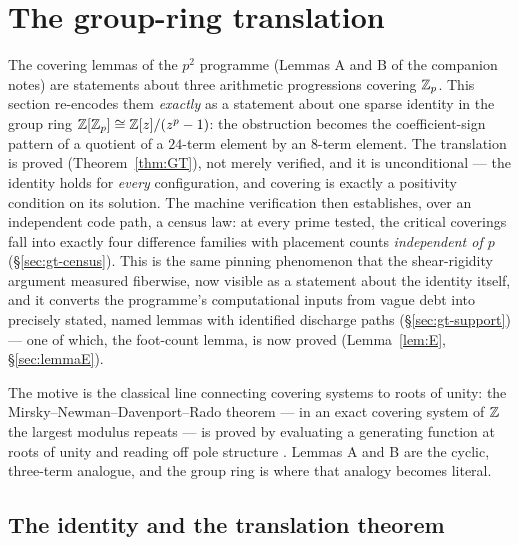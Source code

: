 
\section{The group-ring translation}\label{sec:groupring}

The covering lemmas of the $p^2$ programme (Lemmas A and B of the companion
notes) are statements about three arithmetic progressions covering $\mathbb{Z}_p$.
This section re-encodes them \emph{exactly} as a statement about one sparse
identity in the group ring $\mathbb{Z}[\mathbb{Z}_p]\cong\mathbb{Z}[z]/(z^p-1)$: the obstruction
becomes the coefficient-sign pattern of a quotient of a $24$-term element by
an $8$-term element. The translation is proved (Theorem~\ref{thm:GT}), not
merely verified, and it is unconditional --- the identity holds for
\emph{every} configuration, and covering is exactly a positivity condition on
its solution. The machine verification then establishes, over an independent
code path, a census law: at every prime tested, the critical coverings fall
into exactly four difference families with placement counts \emph{independent
of $p$} (\S\ref{sec:gt-census}). This is the same pinning phenomenon that the
shear-rigidity argument measured fiberwise, now visible as a statement about
the identity itself, and it converts the programme's computational inputs
from vague debt into precisely stated, named lemmas with identified
discharge paths (\S\ref{sec:gt-support}) --- one of which, the foot-count
lemma, is now proved (Lemma~\ref{lem:E}, \S\ref{sec:lemmaE}).

The motive is the classical line connecting covering systems to roots of
unity: the Mirsky--Newman--Davenport--Rado theorem --- in an exact covering
system of $\mathbb{Z}$ the largest modulus repeats --- is proved by evaluating a
generating function at roots of unity and reading off pole structure
\cite{MirskyNewman}. Lemmas A and B are the cyclic, three-term analogue, and
the group ring is where that analogy becomes literal.

\subsection{The identity and the translation theorem}\label{sec:gt-identity}

